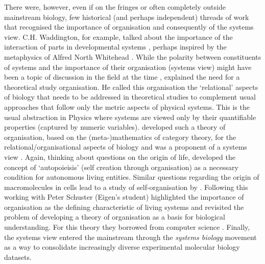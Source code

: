 There were, however, even if on the fringes or often completely outside
mainstream biology, few historical (and perhaps independent) threads of work
that recognised the importance of organisation and consequently of the systems
view. C.H. Waddington, for example, talked about the importance of the
interaction of parts in developmental systems \citep{allen_evolution_1977},
perhaps inspired by the metaphysics of Alfred North Whitehead \citep[same
book;][Autobiographical note]{allen_evolution_1977}. While the polarity between
constituents of systems and the importance of their organisation (systems view)
might have been a topic of discussion in the field at the time
\citep{waddington_nature_1961}, \citet{rashevsky_topology_1954} explained the
need for a theoretical study organisation. He called this organisation the
`relational' aspects of biology that needs to be addressed in theoretical
studies to complement usual approaches that follow only the metric aspects of
physical systems. This is the usual abstraction in Physics where systems are
viewed only by their quantifiable properties (captured by numeric
variables). \citet{rosen_relational_1958} developed such a theory of
organisation, based on the (meta-)mathematics of category theory, for the
relational/organisational aspects of biology and was a proponent of a systems
view \citep{rosen1991life}. Again, thinking about questions on the origin of
life, \citet{varela_autopoiesis:_1974} developed the concept of `autopoieisis'
(self creation through organisation) as a necessary condition for autonomous
living entities. Similar questions regarding the origin of macromolecules in
cells lead to a study of self-organisation by
\citet{eigen_selforganization_1971}. Following this \citet{fontana_what_1994}
working with Peter Schuster (Eigen's student) highlighted the importance of
organisation as the defining characteristic of living systems and revisited
the problem of developing a theory of organisation as a basis for biological
understanding. For this theory they borrowed from computer science
\citep[$\lambda$-calculus in particular;][]{fontana_barrier_1996}. Finally, the
systems view entered the mainstream through the \emph{systems biology} movement
\citep{kitano2002systems} as a way to consolidate increasingly diverse
experimental molecular biology datasets.

